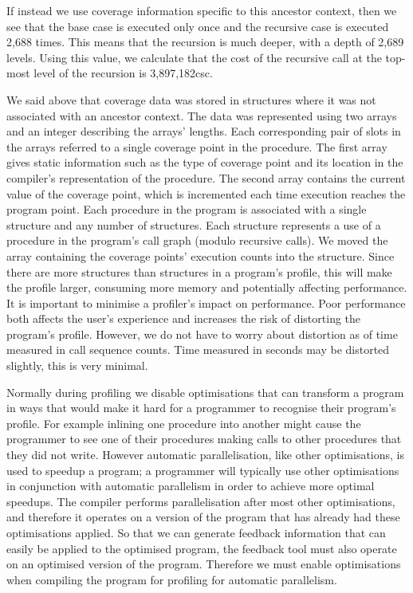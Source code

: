 If instead we use coverage information specific to this ancestor context,
then we see that the base case is executed only once and the recursive case
is executed 2,688 times.
This means that the recursion is much deeper,
with a depth of 2,689 levels.
Using this value,
we calculate that the cost of the recursive call at the top-most level of
the recursion is
3,897,182csc.

We said above that coverage data was stored in \PS structures where it was
not associated with an ancestor context.
The data was represented using two arrays and an integer describing the
arrays' lengths.
Each corresponding pair of slots in the arrays referred to a single coverage
point in the procedure.
The first array gives static information such as the type of coverage point and
its location in the compiler's representation of the procedure.
The second array contains the current value of the coverage point,
which is incremented each time execution reaches the program point.
Each procedure in the program is associated with a single \PS structure
and any number of \PD structures.
Each \PD structure represents a use of a procedure in the program's
call graph (modulo recursive calls).
We moved the array containing the coverage points' execution
counts into the \PD structure.
Since there are more \PD structures than \PS structures in a program's
profile,
this will make the profile larger, consuming more memory and potentially
affecting performance.
It is important to minimise a profiler's impact on performance.
Poor performance both affects the user's experience and
increases the risk of distorting the program's profile.
However, we do not have to worry about distortion as of time measured in
call sequence counts.
Time measured in seconds may be distorted slightly, this is very minimal.

Normally during profiling we disable optimisations that can transform a
program in ways that would make it hard for a programmer to recognise their
program's profile.
For example inlining one procedure into another might cause the programmer
to see one of their procedures making calls to other procedures that they
did not write.
However automatic parallelisation, like other optimisations,
is used to speedup a program;
a programmer will typically use other optimisations in conjunction with
automatic parallelism in order to achieve more optimal speedups.
The compiler performs parallelisation after most other optimisations,
and therefore it operates on a version of the program that has already had
these optimisations applied.
So that we can generate feedback information that can easily be applied to
the optimised program,
the feedback tool must also operate on an optimised version of the program.
Therefore we must enable optimisations when compiling the program for
profiling for automatic parallelism.

